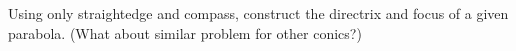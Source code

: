 Using only straightedge and compass,
construct the directrix and focus of a given parabola.
\newline (What about similar problem for other conics?)
